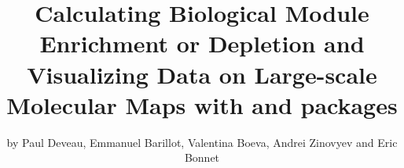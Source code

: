 
\author{by Paul Deveau, Emmanuel Barillot, Valentina Boeva, Andrei Zinovyev and Eric Bonnet} %
\title{Calculating Biological Module Enrichment or Depletion and Visualizing Data on Large-scale Molecular Maps with  and  packages} %
\maketitle


